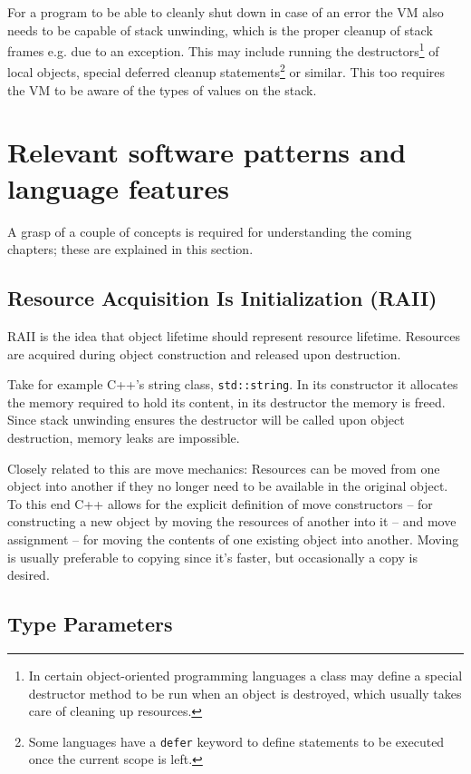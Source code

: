 		For a program to be able to cleanly shut down in case of an error the VM also needs to be capable of stack unwinding, which is the proper cleanup of stack frames e.g. due to an exception. This may include running the destructors\footnote{In certain object-oriented programming languages a class may define a special destructor method to be run when an object is destroyed, which usually takes care of cleaning up resources.} of local objects, special deferred cleanup statements\footnote{Some languages have a \lstinline$defer$ keyword to define statements to be executed once the current scope is left.} or similar. This too requires the VM to be aware of the types of values on the stack.
	
	\section{Relevant software patterns and language features}
		
		
		A grasp of a couple of concepts is required for understanding the coming chapters; these are explained in this section.		
		
		\subsection{Resource Acquisition Is Initialization (RAII)}
		
		RAII is the idea that object lifetime should represent resource lifetime. Resources are acquired during object construction and released upon destruction.
		
		Take for example C++'s string class, \lstinline$std::string$. In its constructor it allocates the memory required to hold its content, in its destructor the memory is freed. Since stack unwinding ensures the destructor will be called upon object destruction, memory leaks are impossible.
		
		Closely related to this are move mechanics: Resources can be moved from one object into another if they no longer need to be available in the original object. To this end C++ allows for the explicit definition of move constructors -- for constructing a new object by moving the resources of another into it -- and move assignment -- for moving the contents of one existing object into another. Moving is usually preferable to copying since it's faster, but occasionally a copy is desired.
		
		\subsection{Type Parameters}
		
